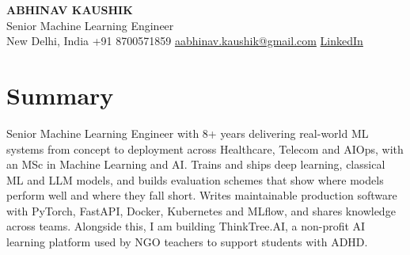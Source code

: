 \documentclass[10pt,a4paper]{article}
\begin{document}
\begin{center}
  {\LARGE\bfseries ABHINAV KAUSHIK}\\[2pt]
  {\large Senior Machine Learning Engineer}\\[2pt]
  New Delhi, India \textbar{} +91 8700571859 \textbar{} \href{mailto:aabhinav.kaushik@gmail.com}{aabhinav.kaushik@gmail.com} \textbar{} \href{https://www.linkedin.com/in/abhinav-kaushik10/}{LinkedIn}  
\end{center}

\section{Summary}
Senior Machine Learning Engineer with 8+ years delivering real-world ML systems from concept to deployment across Healthcare, Telecom and AIOps, with an MSc in Machine Learning and AI. Trains and ships deep learning, classical ML and LLM models, and builds evaluation schemes that show where models perform well and where they fall short. Writes maintainable production software with PyTorch, FastAPI, Docker, Kubernetes and MLflow, and shares knowledge across teams. Alongside this, I am building ThinkTree.AI, a non-profit AI learning platform used by NGO teachers to support students with ADHD.
\end{document}

